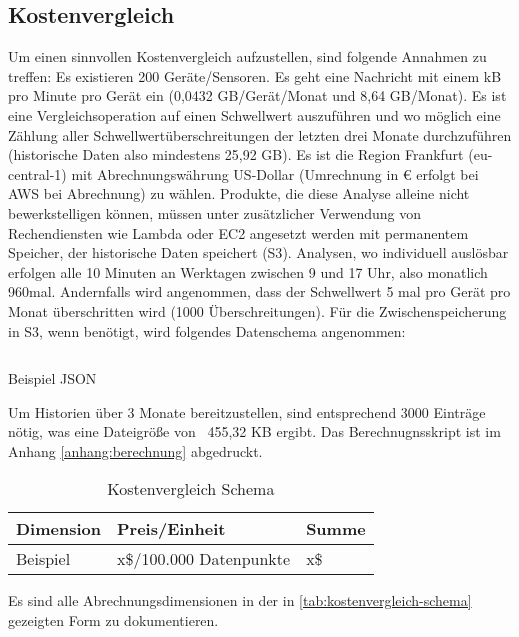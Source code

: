 \subsection{Kostenvergleich}
Um einen sinnvollen Kostenvergleich aufzustellen, sind folgende Annahmen zu treffen:
Es existieren 200 Geräte/Sensoren. Es geht eine Nachricht mit einem kB pro Minute pro Gerät ein (0,0432 GB/Gerät/Monat und 8,64 GB/Monat).
Es ist eine Vergleichsoperation auf einen Schwellwert auszuführen und wo möglich eine Zählung aller Schwellwertüberschreitungen der letzten drei Monate durchzuführen (historische Daten also mindestens 25,92 GB).  Es ist die Region Frankfurt (eu-central-1) mit Abrechnungswährung US-Dollar (Umrechnung in € erfolgt bei \ac{AWS} bei Abrechnung) zu wählen. Produkte, die diese Analyse alleine nicht bewerkstelligen können, müssen unter zusätzlicher Verwendung von Rechendiensten wie Lambda oder \ac{EC2} angesetzt werden mit permanentem Speicher, der historische Daten speichert (\ac{S3}). Analysen, wo individuell auslösbar erfolgen alle 10 Minuten an Werktagen zwischen 9 und 17 Uhr, also monatlich 960mal. Andernfalls wird angenommen, dass der Schwellwert 5 mal pro Gerät pro Monat überschritten wird (1000 Überschreitungen).
Für die Zwischenspeicherung in S3, wenn benötigt, wird folgendes Datenschema angenommen:

\begin{listing}[H]
\inputminted[frame=lines,breaklines=true]{json}{estimates/filtered-estimate.json}
\caption[Beispiel JSON]{Beispiel \ac{JSON}}
\label{listing:json}
\end{listing}
Um Historien über 3 Monate bereitzustellen, sind entsprechend 3000 Einträge nötig, was eine Dateigröße von ~455,32 KB ergibt. Das Berechnugnsskript ist im Anhang \ref{anhang:berechnung} abgedruckt.


\begin{table}[H]
\centering
\begin{tabular}{|l|l|l|}
\hline
Dimension & Preis/Einheit           & Summe \\ \hline
Beispiel  & x\$/100.000 Datenpunkte & x\$  \\\hline
\end{tabular}
\caption{Kostenvergleich Schema}
\label{tab:kostenvergleich-schema}
\end{table}
Es sind alle Abrechnungsdimensionen in der in \autoref{tab:kostenvergleich-schema} gezeigten Form zu dokumentieren.
